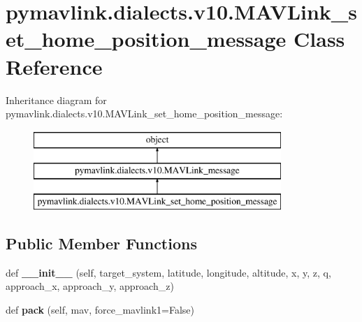\hypertarget{classpymavlink_1_1dialects_1_1v10_1_1MAVLink__set__home__position__message}{}\section{pymavlink.\+dialects.\+v10.\+M\+A\+V\+Link\+\_\+set\+\_\+home\+\_\+position\+\_\+message Class Reference}
\label{classpymavlink_1_1dialects_1_1v10_1_1MAVLink__set__home__position__message}
Inheritance diagram for pymavlink.\+dialects.\+v10.\+M\+A\+V\+Link\+\_\+set\+\_\+home\+\_\+position\+\_\+message\+:\begin{figure}[H]
\begin{center}
\leavevmode
\includegraphics[height=3.000000cm]{classpymavlink_1_1dialects_1_1v10_1_1MAVLink__set__home__position__message}
\end{center}
\end{figure}
\subsection*{Public Member Functions}
\begin{DoxyCompactItemize}
\item 
\mbox{\label{classpymavlink_1_1dialects_1_1v10_1_1MAVLink__set__home__position__message_aa38b87f604bf33831904b495b954155d}} 
def {\bfseries \+\_\+\+\_\+init\+\_\+\+\_\+} (self, target\+\_\+system, latitude, longitude, altitude, x, y, z, q, approach\+\_\+x, approach\+\_\+y, approach\+\_\+z)
\item 
\mbox{\label{classpymavlink_1_1dialects_1_1v10_1_1MAVLink__set__home__position__message_a7c9bc9a2cf6ddb0894d0bc50e6f08855}} 
def {\bfseries pack} (self, mav, force\+\_\+mavlink1=False)
\end{DoxyCompactItemize}
